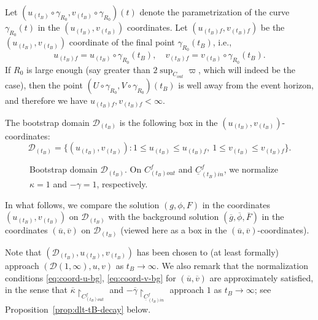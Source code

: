 \documentclass[10pt, reqno]{amsart}
\theoremstyle{definition}
\theoremstyle{remark}
\theoremstyle{conjecture}
\numberwithin{equation}{section}
\newcommand{\set}[1]{\{#1\}}
\newcommand{\0}{\emptyset}
\newcommand{\gmm}{\gamma}
\newcommand{\kpp}{\kappa}
\newcommand{\lmb}{\lambda}
\newcommand{\calD}{\mathcal D}
\newcommand{\calH}{\mathcal H}
\newcommand{\calI}{\mathcal I}
\newcommand{\uC}{\underline{C}}
\newcommand{\dur}{\nu}
\newcommand{\dvr}{\lmb}
\newcommand{\EH}{\calH^{+}}
\newcommand{\NI}{\calI^{+}}						%
\newcommand{\gbg}{\overline{g}}					%
\newcommand{\Fbg}{\overline{F}}					%
\newcommand{\ubg}{\overline{u}}					%
\newcommand{\vbg}{\overline{v}}					%
\newcommand{\phibg}{\overline{\phi}}				%
\newcommand{\kppbg}{\overline{\kpp}}					%
\newcommand{\gmmbg}{\overline{\gmm}}					%
\begin{document}
Let $(u_{(t_{B})} \circ \gmm_{R_{0}}, v_{(t_{B})} \circ \gmm_{R_{0}})(t)$ denote the parametrization of the curve $\gmm_{R_{0}}(t)$ in the $(u_{(t_{B})}, v_{(t_{B})})$ coordinates. Let $(u_{(t_{B}) f}, v_{(t_{B}) f})$ be the $(u_{(t_{B})}, v_{(t_{B})})$ coordinate of the final point $\gmm_{R_{0}}(t_{B})$, i.e.,
\begin{equation*}
u_{(t_{B}) f} = u_{(t_{B})} \circ \gmm_{R_{0}}(t_{B}), \quad
v_{(t_{B}) f} = v_{(t_{B})} \circ \gmm_{R_{0}}(t_{B}).
\end{equation*}
If $R_{0}$ is large enough (say greater than $2 \sup_{C_{out}} \varpi$, which will indeed be the case), then the point $(U \circ \gmm_{R_{0}} , V \circ \gmm_{R_{0}})(t_{B})$ is well away from the event horizon, and therefore we have $u_{(t_{B}) f}, v_{(t_{B}) f} < \infty$. 

The bootstrap domain $\calD_{(t_{B})}$ is the following box in the $(u_{(t_{B})}, v_{(t_{B})})$-coordinates:
\begin{equation}
	\calD_{(t_{B})} = \set{(u_{(t_{B})}, v_{(t_{B})}) : 1 \leq u_{(t_{B})} \leq u_{(t_{B}) f}, \ 1 \leq v_{(t_{B})} \leq v_{(t_{B}) f} }.
\end{equation}
\begin{figure}[h]
\begin{center}
\def\svgwidth{250px}
 
\caption{Bootstrap domain $\calD_{(t_{B})}$. On $C_{(t_{B}) out}^{f}$ and $\uC_{(t_{B}) in}^{f}$, we normalize $\kpp = 1$ and $-\gmm = 1$, respectively.} \label{fig:btstrp-dom}
\end{center}
\end{figure}

In what follows, we compare the solution $(g, \phi, F)$ in the coordinates $(u_{(t_{B})}, v_{(t_{B})})$  on $\calD_{(t_{B})}$ with the background solution $(\gbg, \phibg, \Fbg)$ in the coordinates $(\ubg, \vbg)$ on $\calD_{(t_{B})}$ (viewed here as a box in the $(\ubg, \vbg)$-coordinates).

Note that $(\calD_{(t_{B})}, u_{(t_{B})}, v_{(t_{B})})$ has been chosen to (at least formally) approach $(\calD(1, \infty), u, v)$ as $t_{B} \to \infty$. We also remark that the normalization conditions \eqref{eq:coord-u-bg}, \eqref{eq:coord-v-bg} for $(\ubg, \vbg)$ are approximately satisfied, in the sense that $\kppbg \restriction_{C_{(t_{B}) out}^{f}}$ and $-\gmmbg \restriction_{\uC_{(t_{B}) in}^{f}}$ approach $1$ as $t_{B} \to \infty$; see Proposition~\ref{prop:dlt-tB-decay} below.
\end{document}
